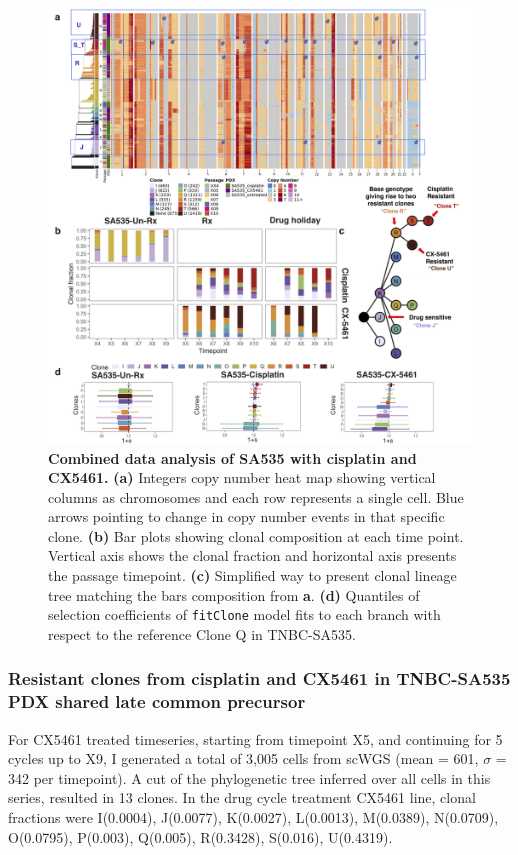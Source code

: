 \begin{figure}
\centering
\includegraphics[width=\textwidth]{Figures/chap4/SA535combinebarplots.png}
	
\caption[Combined data analysis of SA535 with cisplatin and CX5461]
	{\small
	\textbf{Combined data analysis of SA535 with cisplatin and CX5461.}
		\textbf{(a)} Integers copy number heat map showing vertical columns as chromosomes and each row represents a single cell. Blue arrows pointing to change in copy number events in that specific clone. \textbf{(b)} Bar plots showing clonal composition at each time point. Vertical axis shows the clonal fraction and horizontal axis presents the passage timepoint. \textbf{(c)} Simplified way to present clonal lineage tree matching the bars composition from \textbf{a}. \textbf{(d)} Quantiles of selection coefficients of \texttt{fitClone} model fits to each branch with respect to the reference Clone Q in TNBC-SA535. 
	}
	\label{fig:SA535combinebarplots}
\end{figure}


\subsubsection{Resistant clones from cisplatin and CX5461 in TNBC-SA535 PDX shared late common precursor}
For CX5461 treated timeseries, starting from timepoint X5, and continuing for 5 cycles up to X9, I generated a total of 3,005 cells from scWGS (mean = 601, $\sigma$ = 342 per timepoint). A cut of the phylogenetic tree inferred over all cells in this series, resulted in 13 clones. In the drug cycle treatment CX5461 line, clonal fractions were I(0.0004), J(0.0077), K(0.0027), L(0.0013), M(0.0389), N(0.0709), O(0.0795), P(0.003), Q(0.005), R(0.3428), S(0.016), U(0.4319). 



